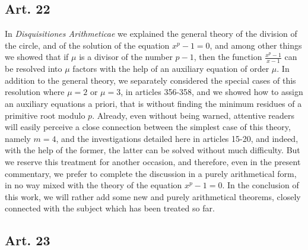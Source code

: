 \documentclass{book}
\theoremstyle{plain}
\theoremstyle{remark}
\begin{document}
\subsection*{Art. 22} 

In \textit{Disquisitiones Arithmeticae} we explained the general theory of the division of the circle, and of the solution of the equation $x^p-1=0$, and among other things we showed that if $\mu$ is a divisor of the number $p-1$, then the function $\frac{x^p-1}{x-1}$  can be resolved into $\mu$ factors with the help of an auxiliary equation of order $\mu$.  In addition to the general theory, we separately considered the special cases of this resolution where $\mu =2$ or $\mu=3$, in articles 356-358, and we showed how to assign an auxiliary equations a priori, that is without finding the minimum residues of a primitive root modulo $p$. Already, even without being warned, attentive readers will easily perceive a close connection between the simplest case of this theory, namely $m=4$, and the investigations detailed here in articles 15-20, and indeed, with the help of the former, the latter can be solved without much difficulty.  But we reserve this treatment for another occasion, and therefore, even in the present commentary, we prefer to complete the discussion in a purely arithmetical form, in no way mixed with the theory of the equation $x^p-1=0$.  In the conclusion of this work, we will rather add some new and purely arithmetical theorems, closely connected with the subject which has been treated so far.

\subsection*{Art. 23} 
\end{document}
